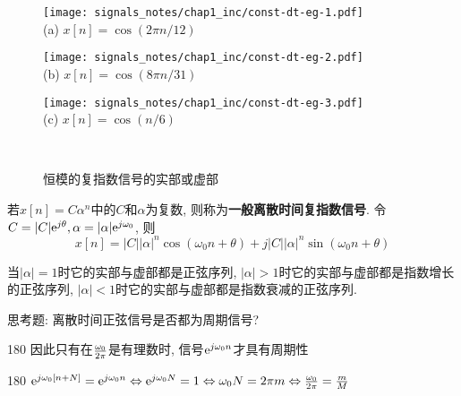                 \begin{figure}[h!]\centering
                    \begin{minipage}{0.3\linewidth}\centering
                        \texttt{[image: signals\_notes/chap1\_inc/const-dt-eg-1.pdf]}\\
                        (a) $x[n]=\cos(2\pi n/12)$
                    \end{minipage}
                    \begin{minipage}{0.3\linewidth}\centering
                        \texttt{[image: signals\_notes/chap1\_inc/const-dt-eg-2.pdf]}\\
                        (b) $x[n]=\cos(8\pi n/31)$
                    \end{minipage}
                    \begin{minipage}{0.3\linewidth}\centering
                        \texttt{[image: signals\_notes/chap1\_inc/const-dt-eg-3.pdf]}\\
                        (c) $x[n]=\cos(n/6)$
                    \end{minipage}\\
                    \caption{恒模的复指数信号的实部或虚部}
                    \label{fig:2:const-dt-egs}
                \end{figure}

                若$x[n]=C\alpha^n$中的$C$和$\alpha$为复数, 则称为\textbf{一般离散时间复指数信号}. 令$C=|C|\mathrm{e}^{j\theta}, \alpha=|\alpha|\mathrm{e}^{j\omega_0}$, 则
                \[x[n]=|C||\alpha|^n\cos(\omega_0n+\theta)+j|C||\alpha|^n\sin(\omega_0n+\theta)\]

                当$|\alpha|=1$时它的实部与虚部都是正弦序列, $|\alpha|>1$时它的实部与虚部都是指数增长的正弦序列, $|\alpha|<1$时它的实部与虚部都是指数衰减的正弦序列.

                思考题: 离散时间正弦信号是否都为周期信号?

                \hfill \begin{rotate}{180}
                    因此只有在$\omega_0\over2\pi$是有理数时, 信号$\mathrm{e}^{j\omega_0n}$才具有周期性
                \end{rotate}

                \hfill \begin{rotate}{180}
                    $\mathrm{e}^{j\omega_0[n+N]}=\mathrm{e}^{j\omega_0n}\Leftrightarrow \mathrm{e}^{j\omega_0N}=1\Leftrightarrow\omega_0N=2\pi m\Leftrightarrow\frac{\omega_0}{2\pi}=\frac{m}{M}$
                \end{rotate}

